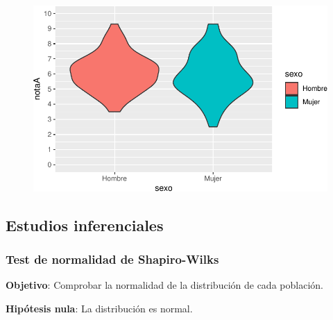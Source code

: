 \documentclass[
  a4paper,
]{scrreport}
\newenvironment{Shaded}{\begin{snugshade}}{\end{snugshade}}
\newcommand{\AttributeTok}[1]{\textcolor[rgb]{0.40,0.45,0.13}{#1}}
\newcommand{\FunctionTok}[1]{\textcolor[rgb]{0.28,0.35,0.67}{#1}}
\newcommand{\NormalTok}[1]{\textcolor[rgb]{0.00,0.23,0.31}{#1}}
\newcommand{\OtherTok}[1]{\textcolor[rgb]{0.00,0.23,0.31}{#1}}
\newcommand{\SpecialCharTok}[1]{\textcolor[rgb]{0.37,0.37,0.37}{#1}}
\newcommand{\StringTok}[1]{\textcolor[rgb]{0.13,0.47,0.30}{#1}}
\theoremstyle{definition}
\theoremstyle{definition}
\theoremstyle{remark}
\begin{document}
\begin{figure}[H]

{\centering \includegraphics{./08-analisis-estadisticos_files/figure-pdf/unnamed-chunk-29-1.pdf}

}

\end{figure}

\hypertarget{estudios-inferenciales-2}{%
\subsection{Estudios inferenciales}\label{estudios-inferenciales-2}}

\hypertarget{test-de-normalidad-de-shapiro-wilks}{%
\subsubsection{Test de normalidad de
Shapiro-Wilks}\label{test-de-normalidad-de-shapiro-wilks}}

\textbf{Objetivo}: Comprobar la normalidad de la distribución de cada
población.

\textbf{Hipótesis nula}: La distribución es normal.

\begin{Shaded}
\end{Shaded}
\end{document}
